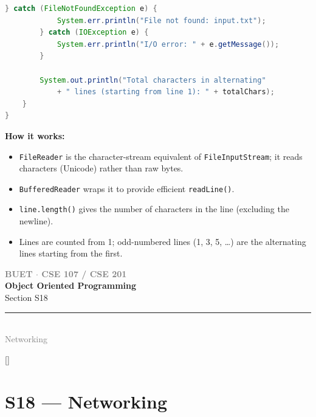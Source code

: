 \documentclass[12pt,a3paper]{article}
\newcommand{\secdivider}[4]{%
  \newpage\thispagestyle{empty}%
  \vspace*{\fill}%
  \begin{tcolorbox}[enhanced,colback=#4!7,colframe=#3,boxrule=1.5pt,arc=8pt,
    left=20pt,right=20pt,top=22pt,bottom=22pt,
    shadow={3pt}{-3pt}{0pt}{black!15}]
    \centering
    {\large\textcolor{gray}{\textbf{BUET $\cdot$ CSE 107 / CSE 201}}}\\[8pt]
    {\fontsize{26}{32}\selectfont\bfseries\textcolor{#3}{Object Oriented Programming}}\\[6pt]
    {\fontsize{15}{19}\selectfont\textcolor{dgray}{#1}}\\[12pt]
    \textcolor{#3!60}{\rule{0.5\textwidth}{0.5pt}}\\[6pt]
    {\small\textcolor{gray}{#2}}
  \end{tcolorbox}%
  \vspace*{\fill}\newpage%
}
\begin{document}
\begin{enumerate}
\begin{tcolorbox}
\begin{lstlisting}[language=Java]
        } catch (FileNotFoundException e) {
            System.err.println("File not found: input.txt");
        } catch (IOException e) {
            System.err.println("I/O error: " + e.getMessage());
        }

        System.out.println("Total characters in alternating"
            + " lines (starting from line 1): " + totalChars);
    }
}
\end{lstlisting}

\textbf{How it works:}
\begin{itemize}[itemsep=2pt]
  \item \texttt{FileReader} is the character-stream
  equivalent of \texttt{FileInputStream}; it reads
  characters (Unicode) rather than raw bytes.
  \item \texttt{BufferedReader} wraps it to provide
  efficient \texttt{readLine()}.
  \item \texttt{line.length()} gives the number of
  characters in the line (excluding the newline).
  \item Lines are counted from 1; odd-numbered lines
  (1, 3, 5, \ldots) are the alternating lines
  starting from the first.
\end{itemize}

\end{tcolorbox}


\end{enumerate}
\newpage

\secdivider{Section S18}{Networking}{cB}{cB}
\label{sec:S18}
\titleformat{\section}{\large\bfseries\color{cB}}{}{0em}{}[\titlerule]
\section{S18 --- Networking}
\end{document}
